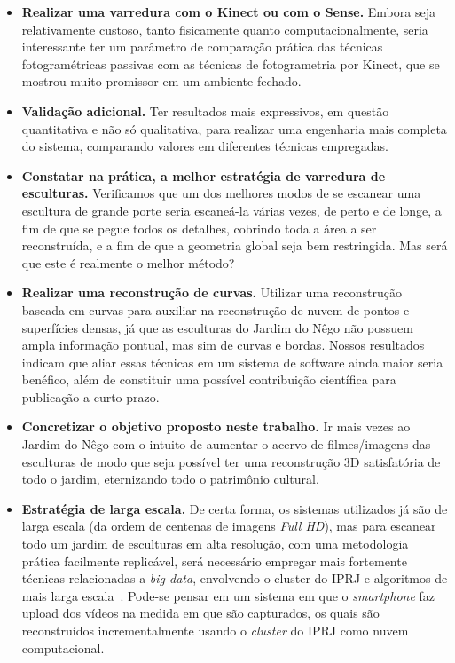 \begin{itemize}[leftmargin=2.5cm]
\item \textbf{Realizar uma varredura com o Kinect ou com o Sense.} Embora seja relativamente
  custoso, tanto fisicamente quanto computacionalmente, seria interessante ter
  um parâmetro de comparação prática das técnicas fotogramétricas passivas com
as técnicas de fotogrametria por Kinect, que se mostrou muito promissor em um
ambiente fechado.  
\item \textbf{Validação adicional.} Ter resultados mais
  expressivos, em questão quantitativa e não só qualitativa, para realizar uma
  engenharia mais completa do sistema, comparando valores em diferentes técnicas
  empregadas.
\item \textbf{Constatar na prática, a melhor estratégia de varredura de
  esculturas.}
Verificamos que um dos melhores modos de se escanear uma escultura de grande
porte seria escaneá-la várias vezes, de perto e de longe, a fim de que se pegue todos os detalhes,
cobrindo toda a área a ser reconstruída, e a fim de que a geometria global seja
bem restringida. Mas será que este é realmente o melhor método?  
\item \textbf{Realizar uma reconstrução de curvas.} 
  Utilizar uma reconstrução baseada em curvas para auxiliar na reconstrução de
  nuvem de pontos e superfícies densas, já que as esculturas do Jardim do Nêgo
  não possuem ampla informação pontual, mas sim de curvas e bordas. Nossos
  resultados indicam que aliar essas técnicas em um sistema de software ainda
  maior seria benéfico, além de constituir uma possível contribuição científica
  para publicação a curto prazo.
\item \textbf{Concretizar o objetivo proposto neste trabalho.} Ir mais vezes
  ao Jardim do Nêgo com o intuito de aumentar o acervo de filmes/imagens das
  esculturas de modo que seja possível ter uma reconstrução 3D satisfatória de
  todo o jardim, eternizando todo o patrimônio cultural.  
\item \textbf{Estratégia de larga escala.} De certa forma, os sistemas
  utilizados já são de
  larga escala (da ordem de centenas de imagens \emph{Full HD}), mas para escanear todo um jardim de esculturas em alta
  resolução, com uma metodologia prática facilmente replicável,
  será necessário empregar mais fortemente técnicas relacionadas a \emph{big data}, envolvendo o cluster do IPRJ
  e algoritmos de mais larga escala~\cite{Argarwal:Snavely:etal:ICCV09}. Pode-se pensar em um sistema em que o
  \emph{smartphone} faz upload dos vídeos na medida em que são capturados, os
  quais são reconstruídos incrementalmente usando o \emph{cluster} do IPRJ como nuvem computacional.
\end{itemize}
